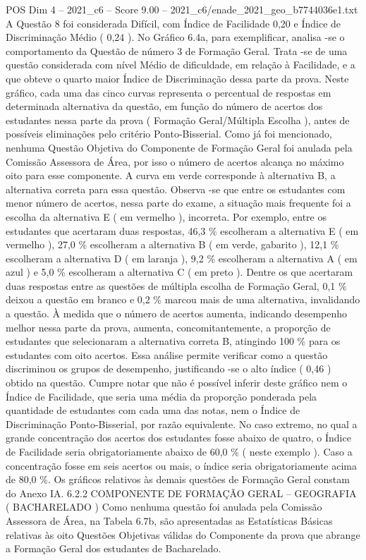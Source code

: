\begin{textsample}{POS Dim 4 – 2021\_c6 – Score 9.00 – 2021\_c6/enade\_2021\_geo\_b7744036e1.txt}
A Questão 8 foi considerada Difícil, com Índice de Facilidade 0,20 e Índice de Discriminação Médio ( 0,24 ).
No Gráfico 6.4a, para exemplificar, analisa -se o comportamento da Questão de número 3 de Formação Geral.
Trata -se de uma questão considerada com nível Médio de dificuldade, em relação à Facilidade, e a que obteve o quarto maior Índice de Discriminação dessa parte da prova.
Neste gráfico, cada uma das cinco curvas representa o percentual de respostas em determinada alternativa da questão, em função do número de acertos dos estudantes nessa parte da prova ( Formação Geral/Múltipla Escolha ), antes de possíveis eliminações pelo critério Ponto-Bisserial.
Como já foi mencionado, nenhuma Questão Objetiva do Componente de Formação Geral foi anulada pela Comissão Assessora de Área, por isso o número de acertos alcança no máximo oito para esse componente.
A curva em verde corresponde à alternativa B, a alternativa correta para essa questão.
Observa -se que entre os estudantes com menor número de acertos, nessa parte do exame, a situação mais frequente foi a escolha da alternativa E ( em vermelho ), incorreta.
Por exemplo, entre os estudantes que acertaram duas respostas, 46,3 \% escolheram a alternativa E ( em vermelho ), 27,0 \% escolheram a alternativa B ( em verde, gabarito ), 12,1 \% escolheram a alternativa D ( em laranja ), 9,2 \% escolheram a alternativa A ( em azul ) e 5,0 \% escolheram a alternativa C ( em preto ).
Dentre os que acertaram duas respostas entre as questões de múltipla escolha de Formação Geral, 0,1 \% deixou a questão em branco e 0,2 \% marcou mais de uma alternativa, invalidando a questão.
À medida que o número de acertos aumenta, indicando desempenho melhor nessa parte da prova, aumenta, concomitantemente, a proporção de estudantes que selecionaram a alternativa correta B, atingindo 100 \% para os estudantes com oito acertos.
Essa análise permite verificar como a questão discriminou os grupos de desempenho, justificando -se o alto índice ( 0,46 ) obtido na questão.
Cumpre notar que não é possível inferir deste gráfico nem o Índice de Facilidade, que seria uma média da proporção ponderada pela quantidade de estudantes com cada uma das notas, nem o Índice de Discriminação Ponto-Bisserial, por razão equivalente.
No caso extremo, no qual a grande concentração dos acertos dos estudantes fosse abaixo de quatro, o Índice de Facilidade seria obrigatoriamente abaixo de 60,0 \% ( neste exemplo ).
Caso a concentração fosse em seis acertos ou mais, o índice seria obrigatoriamente acima de 80,0 \%.
Os gráficos relativos às demais questões de Formação Geral constam do Anexo IA. 6.2.2 COMPONENTE DE FORMAÇÃO GERAL – GEOGRAFIA ( BACHARELADO ) Como nenhuma questão foi anulada pela Comissão Assessora de Área, na Tabela 6.7b, são apresentadas as Estatísticas Básicas relativas às oito Questões Objetivas válidas do Componente da prova que abrange a Formação Geral dos estudantes de Bacharelado.

\end{textsample}
